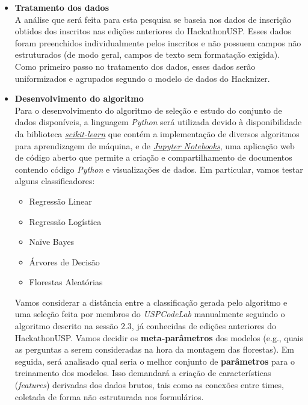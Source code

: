 \documentclass[10pt,twoside,a4paper]{article}
\begin{document}
      \begin{itemize}
          \item \textbf{Tratamento dos dados} \\
          A análise que será feita para esta pesquisa se baseia nos dados de inscrição obtidos dos inscritos nas edições anteriores do HackathonUSP. Esses dados foram preenchidos individualmente pelos inscritos e não possuem campos não estruturados (de modo geral, campos de texto sem formatação exigida). Como primeiro passo no tratamento dos dados, esses dados serão uniformizados e agrupados segundo o modelo de dados do Hacknizer.
      
          \item \textbf{Desenvolvimento do algoritmo} \\
          Para o desenvolvimento do algoritmo de seleção e estudo do conjunto de dados disponíveis, a linguagem \textit{Python} será utilizada devido à disponibilidade da biblioteca \href{http://scikit-learn.org}{\textit{scikit-learn}} que contém a implementação de diversos algoritmos para aprendizagem de máquina, e de \href{http://jupyter.org/}{\textit{Jupyter Notebooks}}, uma aplicação web de código aberto que permite a criação e compartilhamento de documentos contendo código \textit{Python} e visualizações de dados. Em particular, vamos testar alguns classificadores:
          
          \begin{itemize}
              \item Regressão Linear
              \item Regressão Logística
              \item Naïve Bayes
              \item Árvores de Decisão 
              \item Florestas Aleatórias
          \end{itemize}
          
          Vamos considerar a distância entre a classificação gerada pelo algoritmo e uma seleção feita por membros do \textit{USPCodeLab} manualmente seguindo o algoritmo descrito na sessão 2.3, já conhecidas de edições anteriores do HackathonUSP.
          Vamos decidir os \textbf{meta-parâmetros} dos modelos (e.g., quais as perguntas a serem consideradas na hora da montagem das florestas). Em seguida, será analisado qual seria o melhor conjunto de \textbf{parâmetros} para o treinamento dos modelos. Isso demandará a criação de características (\textit{features}) derivadas dos dados brutos, tais como as conexões entre times, coletada de forma não estruturada nos formulários.
          

\end{itemize}
\end{document}
